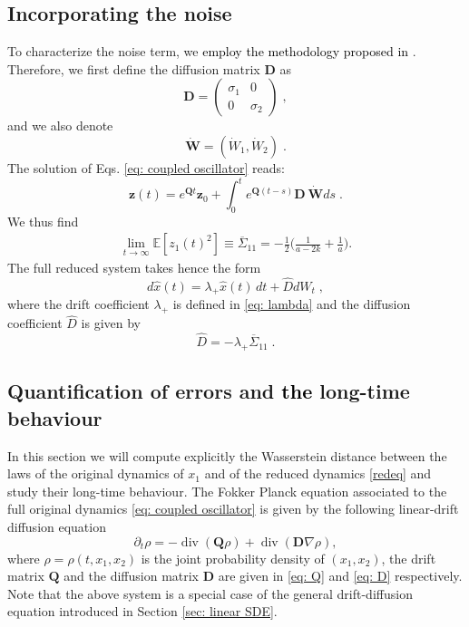 \documentclass[a4paper,twoside]{article}      %
\theoremstyle{definition}
\def\div{\mathop{\mathrm{div}}\nolimits}
\newcommand{\AM}{\textcolor{black}}
\begin{document}
\subsection{Incorporating the noise}
To characterize the noise term, we \AM{employ the methodology proposed in } \cite{CDM22}. Therefore, we first define the diffusion matrix $\boldsymbol{D}$ as
\begin{equation}
\label{eq: D}
\boldsymbol{D}=\begin{pmatrix}
    \sigma_1& 0\\ 0& \sigma_2
\end{pmatrix} \; ,
\end{equation}
and we also denote 
$$
\dot{\mathbf{W}}=(\dot{W}_1,\dot{W}_2) \; .
$$
The solution of Eqs. \eqref{eq: coupled oscillator} reads:
\begin{equation}
\mathbf{z}(t)=e^{\mathbf{Q}t}\mathbf{z}_0+\int_0^t e^{\mathbf{Q}(t-s)}\mathbf{D}~\dot{\mathbf{W}} ds \; .
\end{equation}
We thus find
\begin{align*}
   \lim_{t\rightarrow\infty} \mathbb{E}[z_1(t)^2]\equiv\overline{\Sigma}_{11}= -\frac{1}{2}\Big(
\frac{1}{a-2k}+\frac{1}{a}\Big).
\end{align*}
The full reduced system takes hence the form
\begin{equation}
d\hat{x}(t)=\lambda_+\hat{x}(t)\,dt + \hat{D}dW_t \;, \label{redeq}
\end{equation}
where the drift coefficient $\lambda_+$ is defined in \eqref{eq: lambda} and the diffusion coefficient $\hat{D}$ is given by
\begin{equation}
\hat{D}=-\lambda_+\overline{\Sigma}_{11} \;. \label{redeq2}
\end{equation}

\subsection{Quantification of errors and \AM{the} long-time behaviour}
In this section we will compute explicitly the Wasserstein distance between the laws of the original dynamics of $x_1$ and of the reduced dynamics \eqref{redeq} and study their long-time behaviour. The Fokker Planck equation associated to the full original dynamics \eqref{eq: coupled oscillator} is given by the following linear-drift diffusion equation
\begin{equation}
\label{eq: PDE}
   \partial_t\rho=-\div(\mathbf{Q}\rho)+\div(\boldsymbol{D}\nabla \rho), 
\end{equation}
where $\rho=\rho(t,x_1,x_2)$ is the joint probability density of $(x_1, x_2)$, the drift matrix $\boldsymbol{Q}$ and the diffusion matrix $\boldsymbol{D}$ are given in \eqref{eq: Q} and \eqref{eq: D} respectively. Note that the above system is a special case of the general drift-diffusion equation introduced in Section \ref{sec: linear SDE}.
\end{document}
